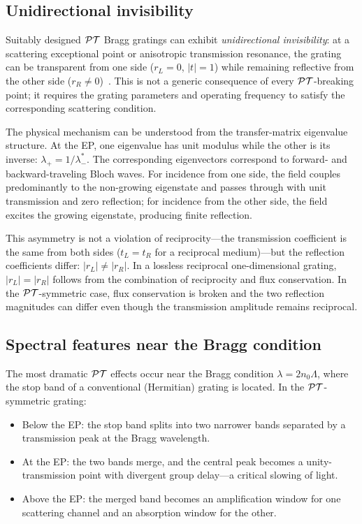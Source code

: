 \subsection{Unidirectional invisibility}
\label{ssec:unidirectional}

Suitably designed $\mathcal{PT}$ Bragg gratings can exhibit
\emph{unidirectional invisibility}: at a scattering exceptional point or
anisotropic transmission resonance, the grating can be transparent from
one side ($r_L = 0$, $|t| = 1$) while remaining reflective from the other
side ($r_R \neq 0$)~\cite{lin2011unidirectional}. This is not a generic
consequence of every $\mathcal{PT}$-breaking point; it requires the grating
parameters and operating frequency to satisfy the corresponding
scattering condition.

The physical mechanism can be understood from the transfer-matrix
eigenvalue structure. At the EP, one eigenvalue has unit modulus
while the other is its inverse: $\lambda_+ = 1/\lambda_-^*$. The
corresponding eigenvectors correspond to forward- and backward-traveling
Bloch waves. For incidence from one side, the field couples
predominantly to the non-growing eigenstate and passes through with
unit transmission and zero reflection; for incidence from the other
side, the field excites the growing eigenstate, producing finite
reflection.

This asymmetry is not a violation of reciprocity---the transmission
coefficient is the same from both sides ($t_L = t_R$ for a reciprocal
medium)---but the reflection coefficients differ:
$|r_L| \neq |r_R|$. In a lossless reciprocal one-dimensional grating,
$|r_L| = |r_R|$ follows from the combination of reciprocity and flux
conservation. In the $\mathcal{PT}$-symmetric case, flux conservation is broken
and the two reflection magnitudes can differ even though the
transmission amplitude remains reciprocal.

\subsection{Spectral features near the Bragg condition}
\label{ssec:pt-bragg-spectrum}

The most dramatic $\mathcal{PT}$ effects occur near the Bragg condition
$\lambda = 2 n_0 \Lambda$, where the stop band of a conventional
(Hermitian) grating is located. In the $\mathcal{PT}$-symmetric grating:
\begin{itemize}
 \item Below the EP: the stop band splits into two narrower bands
 separated by a transmission peak at the Bragg wavelength.
 \item At the EP: the two bands merge, and the central peak becomes
 a unity-transmission point with divergent group delay---a critical
 slowing of light.
 \item Above the EP: the merged band becomes an amplification window
 for one scattering channel and an absorption window for the other.
\end{itemize}

